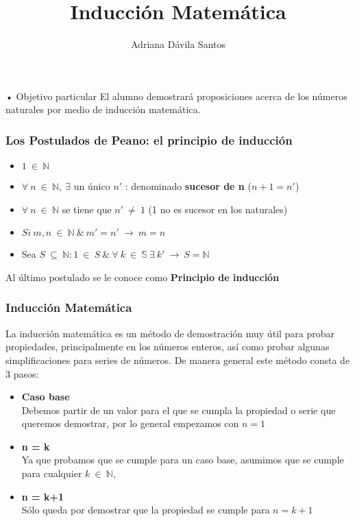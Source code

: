\documentclass[11pt]{beamer}
\author{Adriana Dávila Santos}
\title{Inducción Matemática}
\begin{document}
\begin{frame}
\titlepage
\end{frame}

\begin{frame}{• Objetivo particular}
El alumno demostrará proposiciones acerca de los números naturales por medio de inducción
matemática.
\end{frame}

\begin{frame}
\frametitle{Los Postulados de Peano: el principio de inducción}
\begin{itemize}
\item $1~\in~\mathbb{N}$
\item $\forall~n~\in~\mathbb{N},~\exists$ un único $n'$ : denominado \textbf{sucesor de n} ($n + 1 = n'$)
\item $\forall~n~\in~\mathbb{N}$ se tiene que $n'~\neq~1$ (1 no es sucesor en los naturales)
\item $Si~m,n~\in~\mathbb{N}~\&~m' = n'~\rightarrow~m = n$
\item Sea $S~\subseteq~\mathbb{N} : 1~\in~S~\&~\forall~k~\in~\mathbb{S}~\exists~k'~\rightarrow~S = \mathbb{N}$
\end{itemize} 
Al último postulado se le conoce como \textbf{Principio de inducción}
\end{frame}

\begin{frame}
\frametitle{Inducción Matemática}
La inducción matemática es un método de demostración muy útil para probar propiedades, principalmente en los números enteros,
así como probar algunas simplificaciones para series de números.
De manera general este método consta de 3 pasos:
\begin{itemize}
\item \textbf{Caso base}\\
Debemos partir de un valor para el que se cumpla la propiedad o serie que queremos demostrar, por lo general empezamos 
con $n = 1$
\item \textbf{n = k}\\
Ya que probamos que se cumple para un caso base, asumimos que se cumple para cualquier $k~\in~\mathbb{N}$,
\item \textbf{n = k+1}\\
Sólo queda por demostrar que la propiedad se cumple para $n = k+1$
\end{itemize}
\end{frame}
\end{document}
